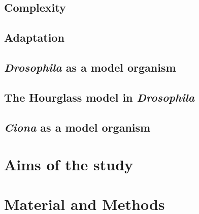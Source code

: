 \documentclass[officiallayout]{tktla_modified}
\begin{document}
%	
	
%	
\section{Complexity}
	
\section{Adaptation}
	
\section{\textit{Drosophila} as a model organism}
	
\section{The Hourglass model in \textit{Drosophila} }
	
\section{\textit{Ciona} as a model organism}
	
	\clearpage

\chapter{Aims of the study}



\chapter{Material and Methods}
\end{document}
